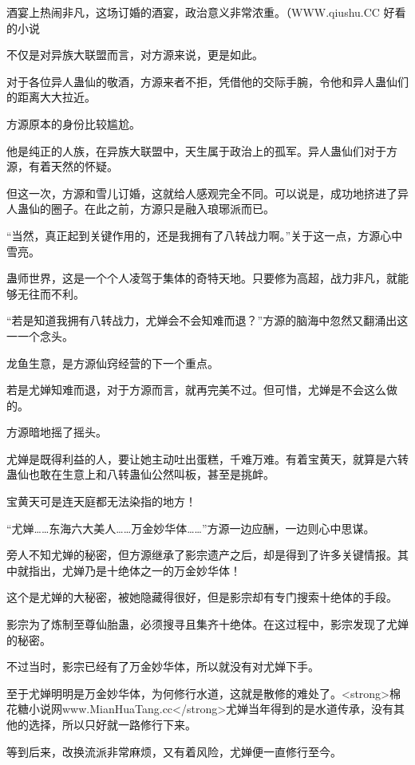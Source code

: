 
\begin{this_body}

酒宴上热闹非凡，这场订婚的酒宴，政治意义非常浓重。（WWW.qiushu.CC 好看的小说

不仅是对异族大联盟而言，对方源来说，更是如此。

对于各位异人蛊仙的敬酒，方源来者不拒，凭借他的交际手腕，令他和异人蛊仙们的距离大大拉近。

方源原本的身份比较尴尬。

他是纯正的人族，在异族大联盟中，天生属于政治上的孤军。异人蛊仙们对于方源，有着天然的怀疑。

但这一次，方源和雪儿订婚，这就给人感观完全不同。可以说是，成功地挤进了异人蛊仙的圈子。在此之前，方源只是融入琅琊派而已。

“当然，真正起到关键作用的，还是我拥有了八转战力啊。”关于这一点，方源心中雪亮。

蛊师世界，这是一个个人凌驾于集体的奇特天地。只要修为高超，战力非凡，就能够无往而不利。

“若是知道我拥有八转战力，尤婵会不会知难而退？”方源的脑海中忽然又翻涌出这一一个念头。

龙鱼生意，是方源仙窍经营的下一个重点。

若是尤婵知难而退，对于方源而言，就再完美不过。但可惜，尤婵是不会这么做的。

方源暗地摇了摇头。

尤婵是既得利益的人，要让她主动吐出蛋糕，千难万难。有着宝黄天，就算是六转蛊仙也敢在生意上和八转蛊仙公然叫板，甚至是挑衅。

宝黄天可是连天庭都无法染指的地方！

“尤婵……东海六大美人……万金妙华体……”方源一边应酬，一边则心中思谋。

旁人不知尤婵的秘密，但方源继承了影宗遗产之后，却是得到了许多关键情报。其中就指出，尤婵乃是十绝体之一的万金妙华体！

这个是尤婵的大秘密，被她隐藏得很好，但是影宗却有专门搜索十绝体的手段。

影宗为了炼制至尊仙胎蛊，必须搜寻且集齐十绝体。在这过程中，影宗发现了尤婵的秘密。

不过当时，影宗已经有了万金妙华体，所以就没有对尤婵下手。

至于尤婵明明是万金妙华体，为何修行水道，这就是散修的难处了。<strong>棉花糖小说网www.MianHuaTang.cc</strong>尤婵当年得到的是水道传承，没有其他的选择，所以只好就一路修行下来。

等到后来，改换流派非常麻烦，又有着风险，尤婵便一直修行至今。


\end{this_body}
